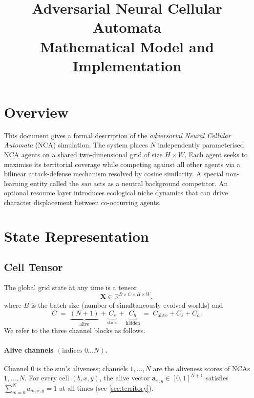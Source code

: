 \documentclass[11pt,a4paper]{article}
\title{\textbf{Adversarial Neural Cellular Automata}\\
\large Mathematical Model and Implementation}
\author{}
\date{}
\newcommand{\R}{\mathbb{R}}
\theoremstyle{definition}
\begin{document}
\maketitle
\tableofcontents
\bigskip

\section{Overview}

This document gives a formal description of the \emph{adversarial Neural Cellular Automata} (NCA) simulation. The system places $N$ independently parameterised NCA agents on a shared two-dimensional grid of size $H \times W$. Each agent seeks to maximise its territorial coverage while competing against all other agents via a bilinear attack-defense mechanism resolved by cosine similarity. A special non-learning entity called the \emph{sun} acts as a neutral background competitor. An optional resource layer introduces ecological niche dynamics that can drive character displacement between co-occurring agents.

\section{State Representation}

\subsection{Cell Tensor}

The global grid state at any time is a tensor
\[
    \mathbf{X} \in \R^{B \times C \times H \times W},
\]
where $B$ is the batch size (number of simultaneously evolved worlds) and
\[
    C \;=\; \underbrace{(N+1)}_{\text{alive}} + \underbrace{C_s}_{\text{state}} + \underbrace{C_h}_{\text{hidden}}
    \;=\; C_{\mathrm{alive}} + C_s + C_h.
\]
We refer to the three channel blocks as follows.

\paragraph{Alive channels $(\text{indices }0\ldots N)$.}
Channel 0 is the sun's aliveness; channels $1,\ldots,N$ are the aliveness scores of NCAs $1,\ldots,N$. For every cell $(b,x,y)$, the alive vector $\mathbf{a}_{x,y} \in [0,1]^{N+1}$ satisfies $\sum_{m=0}^{N} a_{m,x,y} = 1$ at all times (see \cref{sec:territory}).
\end{document}
